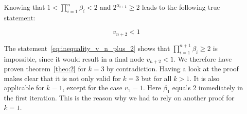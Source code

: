 Knowing that $1<\prod_{i=1}^{n}\beta_i<2$ and $2^{\alpha_{i+1}}\ge2$ leads to the following true statement:

\begin{equation}
\label{eq:inequality_v_n_plus_2}
v_{n+2}<1
\end{equation}

\par\bigskip
The statement~\ref{eq:inequality_v_n_plus_2} shows that $\prod_{i=1}^{n+1}\beta_i\ge2$ is impossible, since it would result in a final node $v_{n+2}<1$. We therefore have proven theorem~\ref{theo:2} for $k=3$ by contradiction. Having a look at the proof makes clear that it is not only valid for $k=3$ but for all $k>1$. It is also applicable for $k=1$, except for the case $v_1=1$. Here  $\beta_1$ equals $2$ immediately in the first iteration. This is the reason why we had to rely on another proof for $k=1$.
